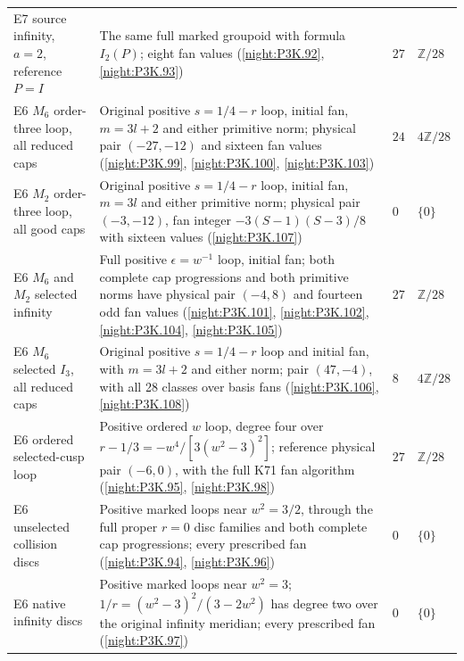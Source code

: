 \begin{longtable}{@{}p{.23\linewidth}p{.37\linewidth}p{.16\linewidth}p{.17\linewidth}@{}}
E7 source infinity, $a=2$, reference $P=I$ & The same full
  marked groupoid with formula $I_2(P)$; eight fan values
  (\cref{night:P3K.92}, \cref{night:P3K.93})
  & $27$ & $\mathbb Z/28$\\
E6 $M_6$ order-three loop, all reduced caps & Original positive
  $s=1/4-r$ loop, initial fan, $m=3l+2$ and either primitive norm;
  physical pair $(-27,-12)$ and sixteen fan values
  (\cref{night:P3K.99}, \cref{night:P3K.100}, \cref{night:P3K.103})
  & $24$ & $4\mathbb Z/28$\\
E6 $M_2$ order-three loop, all good caps & Original positive
  $s=1/4-r$ loop, initial fan, $m=3l$ and either primitive norm;
  physical pair $(-3,-12)$, fan integer $-3(S-1)(S-3)/8$
  with sixteen values (\cref{night:P3K.107})
  & $0$ & $\{0\}$\\
E6 $M_6$ and $M_2$ selected infinity & Full positive
  $\epsilon=w^{-1}$ loop, initial fan; both complete cap
  progressions and both primitive norms have physical pair
  $(-4,8)$ and fourteen odd fan values
  (\cref{night:P3K.101}, \cref{night:P3K.102}, \cref{night:P3K.104}, \cref{night:P3K.105})
  & $27$ & $\mathbb Z/28$\\
E6 $M_6$ selected $I_3$, all reduced caps & Original positive
  $s=1/4-r$ loop and initial fan, with $m=3l+2$ and either norm;
  pair $(47,-4)$, with all 28 classes over basis fans
  (\cref{night:P3K.106}, \cref{night:P3K.108})
  & $8$ & $4\mathbb Z/28$\\
E6 ordered selected-cusp loop & Positive ordered $w$ loop,
  degree four over $r-1/3=-w^4/[3(w^2-3)^2]$; reference
  physical pair $(-6,0)$, with the full K71 fan algorithm
  (\cref{night:P3K.95}, \cref{night:P3K.98})
  & $27$ & $\mathbb Z/28$\\
E6 unselected collision discs & Positive marked loops near
  $w^2=3/2$, through the full proper $r=0$ disc families and
  both complete cap progressions; every prescribed fan
  (\cref{night:P3K.94}, \cref{night:P3K.96})
  & $0$ & $\{0\}$\\
E6 native infinity discs & Positive marked loops near $w^2=3$;
  $1/r=(w^2-3)^2/(3-2w^2)$ has degree two over the original
  infinity meridian; every prescribed fan
  (\cref{night:P3K.97})
  & $0$ & $\{0\}$\\
\end{longtable}
\endgroup


